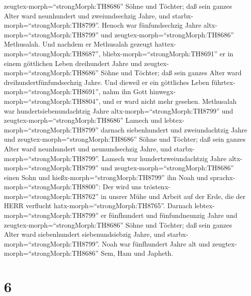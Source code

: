 zeugtex-morph=``strongMorph:TH8686'' Söhne und Töchter; 
daß sein ganzes Alter ward neunhundert und zweiundsechzig Jahre, und
starbx-morph=``strongMorph:TH8799''.  Henoch war
fünfundsechzig Jahre altx-morph=``strongMorph:TH8799'' und
zeugtex-morph=``strongMorph:TH8686'' Methusalah.  Und
nachdem er Methusalah gezeugt hattex-morph=``strongMorph:TH8687'',
bliebx-morph=``strongMorph:TH8691'' er in einem göttlichen Leben
dreihundert Jahre und zeugtex-morph=``strongMorph:TH8686'' Söhne und
Töchter;  daß sein ganzes Alter ward
dreihundertfünfundsechzig Jahre.  Und dieweil er ein
göttliches Leben führtex-morph=``strongMorph:TH8691'', nahm ihn Gott
hinwegx-morph=``strongMorph:TH8804'', und er ward nicht mehr gesehen.
 Methusalah war hundertsiebenundachtzig Jahre
altx-morph=``strongMorph:TH8799'' und
zeugtex-morph=``strongMorph:TH8686'' Lamech  und
lebtex-morph=``strongMorph:TH8799'' darnach siebenhundert und
zweiundachtzig Jahre und zeugtex-morph=``strongMorph:TH8686'' Söhne und
Töchter;  daß sein ganzes Alter ward neunhundert und
neunundsechzig Jahre, und starbx-morph=``strongMorph:TH8799''.
 Lamech war hundertzweiundachtzig Jahre
altx-morph=``strongMorph:TH8799'' und
zeugtex-morph=``strongMorph:TH8686'' einen Sohn  und
hießx-morph=``strongMorph:TH8799'' ihn Noah und
sprachx-morph=``strongMorph:TH8800'': Der wird uns
tröstenx-morph=``strongMorph:TH8762'' in unsrer Mühe und Arbeit auf der
Erde, die der HERR verflucht hatx-morph=``strongMorph:TH8765''.
 Darnach lebtex-morph=``strongMorph:TH8799'' er fünfhundert
und fünfundneunzig Jahre und zeugtex-morph=``strongMorph:TH8686'' Söhne
und Töchter;  daß sein ganzes Alter ward siebenhundert
siebenundsiebzig Jahre, und starbx-morph=``strongMorph:TH8799''.
 Noah war fünfhundert Jahre alt und
zeugtex-morph=``strongMorph:TH8686'' Sem, Ham und Japheth.

\hypertarget{section-5}{%
\section{6}\label{section-5}}

